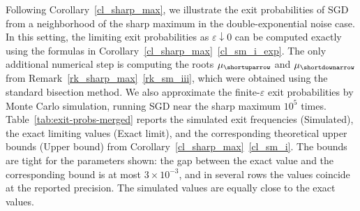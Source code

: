 \documentclass{article}
\theoremstyle{plain}
\theoremstyle{definition}
\theoremstyle{remark}
\begin{document}
Following Corollary~\ref{cl_sharp_max}, we illustrate the exit probabilities of SGD from a neighborhood of the sharp maximum in the double-exponential noise case. In this setting, the limiting exit probabilities as $\varepsilon\downarrow 0$ can be computed exactly using the formulas in Corollary~\ref{cl_sharp_max}~\ref{cl_sm_i_exp}. The only additional numerical step is computing the roots $\mu_{\shortuparrow}$ and $\mu_{\shortdownarrow}$ from Remark~\ref{rk_sharp_max}~\ref{rk_sm_iii}, which were obtained using the standard bisection method. We also approximate the finite-$\varepsilon$ exit probabilities by Monte Carlo simulation, running SGD near the sharp maximum $10^5$ times. Table~\ref{tab:exit-probs-merged} reports the simulated exit frequencies (Simulated), the exact limiting values (Exact limit), and the corresponding theoretical upper bounds (Upper bound) from Corollary~\ref{cl_sharp_max}~\ref{cl_sm_i}. The bounds are tight for the parameters shown: the gap between the exact value and the corresponding bound is at most $3\times 10^{-3}$, and in several rows the values coincide at the reported precision. The simulated values are equally close to the exact values.

\end{document}
